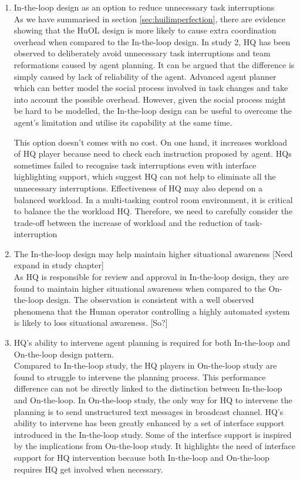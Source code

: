 \begin{enumerate}
\item In-the-loop design as an option to reduce unnecessary task interruptions \\
As we have summarised in section \ref{sec:huilimperfection}, there are evidence showing that the HuOL design is more likely to cause extra coordination overhead when compared to the In-the-loop design. In study 2, HQ has been observed to deliberately avoid unnecessary task interruptions and team reformations caused by agent planning. It can be argued that the difference is simply caused by lack of reliability of the agent. Advanced agent planner which can better model the social process involved in task changes and take into account the possible overhead. However, given the social process might be hard to be modelled, the In-the-loop design can be useful to overcome the agent's limitation and utilise its capability at the same time.  

This option doesn't comes with no cost. On one hand, it increases workload of HQ player because need to check each instruction proposed by agent. HQs sometimes failed to recognise task interruptions even with interface highlighting support, which suggest HQ can not help to eliminate all the unnecessary interruptions. Effectiveness of HQ may also depend on a balanced workload. In a multi-tasking control room environment, it is critical to balance the the workload HQ. Therefore, we need to carefully consider the trade-off between the increase of workload and the reduction of task-interruption \\

\item The In-the-loop design may help maintain higher situational awareness [Need expand in study chapter]\\
As HQ is responsible for review and approval in In-the-loop design, they are found to maintain higher situational awareness when compared to the On-the-loop design. The observation is consistent with a well observed phenomena that the Human operator controlling a highly automated system is likely to loss situational awareness. [So?] \\

\item HQ's ability to intervene agent planning is required for both In-the-loop and On-the-loop design pattern.\\
Compared to In-the-loop study, the HQ players in On-the-loop study are found to struggle to intervene the planning process. This performance difference can not be directly linked to the distinction between In-the-loop and On-the-loop. In On-the-loop study, the only way for HQ to intervene the planning is to send unstructured text messages in broadcast channel. HQ's ability to intervene has been greatly enhanced by a set of interface support introduced in the In-the-loop study. Some of the interface support is inspired by the implications from On-the-loop study. It highlights the need of interface support for HQ intervention because both In-the-loop and On-the-loop requires HQ get involved when necessary. \\


\end{enumerate}
